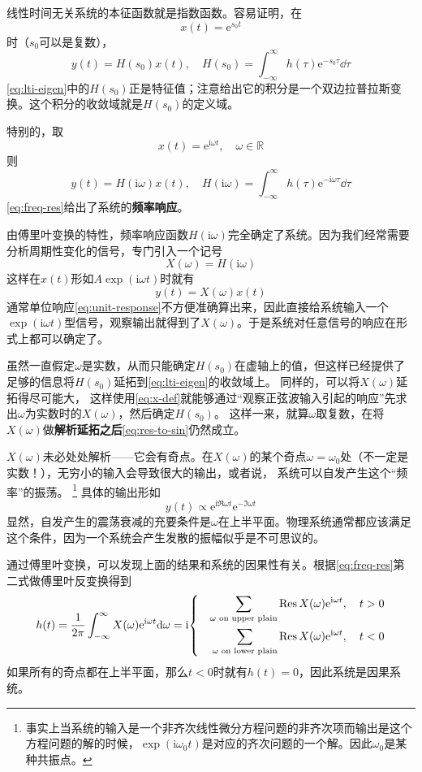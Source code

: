 \documentclass[UTF8]{ctexart}
\newenvironment{bigcase}{\left\{ \quad \begin{aligned}}{\end{aligned}\right.}
\newcommand*{\reals}{\mathbb{R}}
\newcommand*{\ii}{\mathrm{i}}
\newcommand*{\ee}{\mathrm{e}}
\begin{document}
线性时间无关系统的本征函数就是指数函数。容易证明，在
\[
    x(t) = \ee^{s_0 t}
\]
时（$s_0$可以是复数），
\begin{equation}
    y(t) = H(s_0) x(t), \quad H(s_0) = \int_{-\infty}^\infty h(\tau) \ee^{-s_0 \tau} \dd \tau
    \label{eq:lti-eigen}
\end{equation}
\eqref{eq:lti-eigen}中的$H(s_0)$正是特征值；注意给出它的积分是一个双边拉普拉斯变换。这个积分的收敛域就是$H(s_0)$的定义域。

特别的，取
\[
    x(t) = \ee^{\ii \omega t}, \quad \omega \in \reals
\]
则
\begin{equation}
    y(t) = H(\ii \omega) x(t), \quad H(\ii \omega) = \int_{-\infty}^\infty h(\tau) \ee^{- \ii \omega \tau} \dd \tau
    \label{eq:freq-res}
\end{equation}
\eqref{eq:freq-res}给出了系统的\textbf{频率响应}。

由傅里叶变换的特性，频率响应函数$H(\ii \omega)$完全确定了系统。因为我们经常需要分析周期性变化的信号，专门引入一个记号
\begin{equation}
    X(\omega) = H(\ii \omega)
    \label{eq:x-def}
\end{equation}
这样在$x(t)$形如$A \exp(\ii \omega t)$时就有
\begin{equation}
    y(t) = X(\omega) x(t)
    \label{eq:res-to-sin}
\end{equation}
通常单位响应\eqref{eq:unit-response}不方便准确算出来，因此直接给系统输入一个$\exp(\ii \omega t)$型信号，观察输出就得到了$X(\omega)$。于是系统对任意信号的响应在形式上都可以确定了。

虽然一直假定$\omega$是实数，从而只能确定$H(s_0)$在虚轴上的值，但这样已经提供了足够的信息将$H(s_0)$延拓到\eqref{eq:lti-eigen}的收敛域上。
同样的，可以将$X(\omega)$延拓得尽可能大，
这样使用\eqref{eq:x-def}就能够通过“观察正弦波输入引起的响应”先求出$\omega$为实数时的$X(\omega)$，然后确定$H(s_0)$。
这样一来，就算$\omega$取复数，在将$X(\omega)$做\textbf{解析延拓之后}\eqref{eq:res-to-sin}仍然成立。

$X(\omega)$未必处处解析——它会有奇点。在$X(\omega)$的某个奇点$\omega=\omega_0$处（不一定是实数！），无穷小的输入会导致很大的输出，或者说，
系统可以自发产生这个“频率”的振荡。%
\footnote{事实上当系统的输入是一个非齐次线性微分方程问题的非齐次项而输出是这个方程问题的解的时候，$\exp(\ii \omega_0 t)$是对应的齐次问题的一个解。因此$\omega_0$是某种共振点。}
具体的输出形如
\[
    y(t) \propto \ee^{\ii \Re \omega t} \ee^{- \Im \omega t}
\]
显然，自发产生的震荡衰减的充要条件是$\omega$在上半平面。物理系统通常都应该满足这个条件，因为一个系统会产生发散的振幅似乎是不可思议的。

通过傅里叶变换，可以发现上面的结果和系统的因果性有关。根据\eqref{eq:freq-res}第二式做傅里叶反变换得到
\[
    h(t) = \frac{1}{2\pi} \int_{-\infty}^\infty X(\omega) \ee^{\ii \omega t} \dd \omega
    = \ii \begin{bigcase}
        \sum_{\text{$\omega$ on upper plain}} \Res X(\omega) \ee^{\ii \omega t} &, \quad t > 0 \\
        \sum_{\text{$\omega$ on lower plain}} \Res X(\omega) \ee^{\ii \omega t} &, \quad t < 0
    \end{bigcase}
\]
如果所有的奇点都在上半平面，那么$t<0$时就有$h(t)=0$，因此系统是因果系统。
\end{document}
